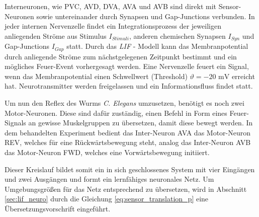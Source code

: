 	Interneuronen, wie PVC, AVD, DVA, AVA und AVB sind direkt mit Sensor-Neuronen sowie untereinander durch Synapsen und Gap-Junctions verbunden. In jeder internen Nervenzelle findet ein Integrationsprozess der jeweiligen anliegenden Ströme aus Stimulus $I_{Stimuli}$, anderen chemischen Synapsen $I_{Syn}$ und Gap-Junctions $I_{Gap}$ statt. Durch das \textit{LIF} - Modell kann das Membranpotential durch anliegende Ströme zum nächstgelegenen Zeitpunkt bestimmt und ein mögliches Feuer-Event vorhergesagt werden. Eine Nervenzelle feuert ein Signal, wenn das Membranpotential einen Schwellwert (\glqq Threshold\grqq) $\vartheta = -20\text{ mV}$ erreicht hat. Neurotransmitter werden freigelassen und ein Informationsfluss findet statt.
	
	Um nun den Reflex des Wurms \textit{C. Elegans} umzusetzen, benötigt es noch zwei Motor-Neuronen. Diese sind dafür zuständig, einen Befehl in Form eines Feuer-Signals an gewisse Muskelgruppen zu übersetzen, damit diese bewegt werden. In dem behandelten Experiment bedient das Inter-Neuron AVA das Motor-Neuron REV, welches für eine Rückwärtsbewegung steht, analog das Inter-Neuron AVB das Motor-Neuron FWD, welches eine Vorwärtsbewegung initiiert.
	
	Dieser Kreislauf bildet somit ein in sich geschlossenes System mit vier Eingängen und zwei Ausgängen und formt ein lernfähiges neuronales Netz. Um Umgebungsgrößen für das Netz entsprechend zu übersetzen, wird in Abschnitt \ref{sec:lif_neuro} durch die Gleichung \eqref{eq:sensor_translation_p} eine Übersetzungsvorschrift eingeführt.

